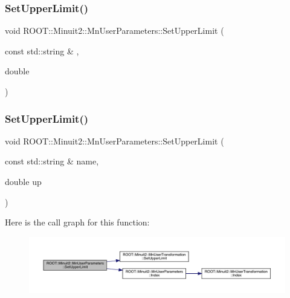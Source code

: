 \subsubsection{\texorpdfstring{SetUpperLimit()}{SetUpperLimit()}\hspace{0.1cm}{\footnotesize\ttfamily [3/4]}}
{\footnotesize\ttfamily void R\+O\+O\+T\+::\+Minuit2\+::\+Mn\+User\+Parameters\+::\+Set\+Upper\+Limit (\begin{DoxyParamCaption}\item[{const std\+::string \&}]{,  }\item[{double}]{ }\end{DoxyParamCaption})}

\mbox{\label{classROOT_1_1Minuit2_1_1MnUserParameters_afc550532eeecdcb361f4c707032067e7}} 
\subsubsection{\texorpdfstring{SetUpperLimit()}{SetUpperLimit()}\hspace{0.1cm}{\footnotesize\ttfamily [4/4]}}
{\footnotesize\ttfamily void R\+O\+O\+T\+::\+Minuit2\+::\+Mn\+User\+Parameters\+::\+Set\+Upper\+Limit (\begin{DoxyParamCaption}\item[{const std\+::string \&}]{name,  }\item[{double}]{up }\end{DoxyParamCaption})}

Here is the call graph for this function\+:\nopagebreak
\begin{figure}[H]
\begin{center}
\leavevmode
\includegraphics[width=350pt]{d6/d10/classROOT_1_1Minuit2_1_1MnUserParameters_afc550532eeecdcb361f4c707032067e7_cgraph}
\end{center}
\end{figure}
\mbox{\label{classROOT_1_1Minuit2_1_1MnUserParameters_a6a2523d00c1b000fbc1c95da7a4a926a}} 

